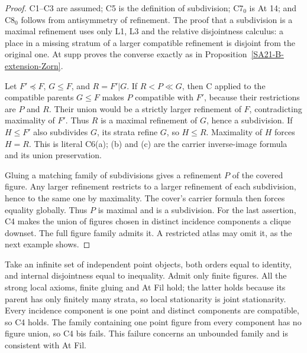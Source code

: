 \begin{proof}
C1--C3 are assumed; C5 is the definition of subdivision; C7\(_0\)
is At 14; and C8\(_0\) follows from antisymmetry of refinement.
The proof that a subdivision is a maximal refinement uses only
L1, L3 and the relative disjointness calculus: a place in a
missing stratum of a larger compatible refinement is disjoint
from the original one. At supp proves the converse exactly as
in Proposition~\ref{SA21-B-extension-Zorn}.

Let \(F'\preceq F\), \(G\leq F\), and \(R=F'|G\).
If \(R<P\ll G\), then C applied to the compatible parents
\(G\leq F\) makes \(P\) compatible with \(F'\), because their
restrictions are \(P\) and \(R\). Their union would be a strictly
larger refinement of \(F\), contradicting maximality of \(F'\).
Thus \(R\) is a maximal refinement of \(G\), hence a subdivision.
If \(H\leq F'\) also subdivides \(G\), its strata refine \(G\),
so \(H\leq R\). Maximality of \(H\) forces \(H=R\).
This is literal C6(a); (b) and (c) are the carrier inverse-image
formula and its union preservation.

Gluing a matching family of subdivisions gives a refinement \(P\)
of the covered figure. Any larger refinement restricts to a
larger refinement of each subdivision, hence to the same one by
maximality. The cover's carrier formula then forces equality
globally. Thus \(P\) is maximal and is a subdivision.
For the last assertion, C4 makes the union of figures chosen in
distinct incidence components a clique downset. The full figure
family admits it. A restricted atlas may omit it, as the next
example shows.
\end{proof}

\begin{counterexample}
\label{SA21-B-C4bis}
Take an infinite set of independent point objects, both orders
equal to identity, and internal disjointness equal to inequality.
Admit only finite figures. All the strong local axioms, finite
gluing and At Fil hold; the latter holds because its parent has
only finitely many strata, so local stationarity is joint
stationarity. Every incidence component is one point and distinct
components are compatible, so C4 holds. The family containing
one point figure from every component has no figure union, so
C4 bis fails. This failure concerns an unbounded family and is
consistent with At Fil.
\end{counterexample}

